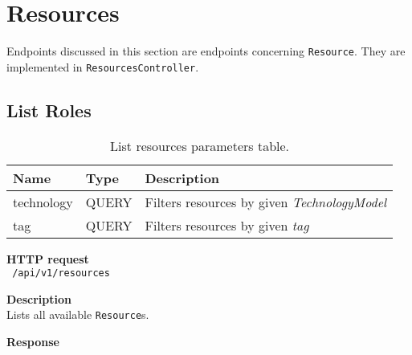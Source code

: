 \section{Resources}
Endpoints discussed in this section are endpoints concerning \texttt{Resource}.
They are implemented in \texttt{ResourcesController}.
\subsection{List Roles}
\begin{table}[ht!]
    \begin{tabularx}{\textwidth}{llX}
        \toprule
        Name & Type & Description \\
        \midrule
        technology & QUERY & Filters resources by given \emph{TechnologyModel} \\  
        tag & QUERY & Filters resources by given \emph{tag}
        \end{tabularx}
    \caption{List resources parameters table.}
\end{table}
\begin{description}
    \item \textbf{HTTP request}\\
        \texttt{\text{[GET]} /api/v1/resources}
    \item \textbf{Description}\\
        Lists all available \texttt{Resource}s.
    \item \textbf{Response}\\
        \texttt{\text{[200 OK]} \text{[Resource]}}
\end{description}
